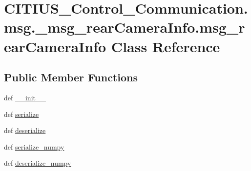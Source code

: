 \hypertarget{class_c_i_t_i_u_s___control___communication_1_1msg_1_1__msg__rear_camera_info_1_1msg__rear_camera_info}{\section{\-C\-I\-T\-I\-U\-S\-\_\-\-Control\-\_\-\-Communication.\-msg.\-\_\-msg\-\_\-rear\-Camera\-Info.\-msg\-\_\-rear\-Camera\-Info \-Class \-Reference}
\label{class_c_i_t_i_u_s___control___communication_1_1msg_1_1__msg__rear_camera_info_1_1msg__rear_camera_info}
}
\subsection*{\-Public \-Member \-Functions}
\begin{DoxyCompactItemize}
\item 
def \hyperlink{class_c_i_t_i_u_s___control___communication_1_1msg_1_1__msg__rear_camera_info_1_1msg__rear_camera_info_af8b34b94c71a6fa082153e6481a459e1}{\-\_\-\-\_\-init\-\_\-\-\_\-}
\item 
def \hyperlink{class_c_i_t_i_u_s___control___communication_1_1msg_1_1__msg__rear_camera_info_1_1msg__rear_camera_info_abccc631270b8fcbbcd4726f9c55a16b2}{serialize}
\item 
def \hyperlink{class_c_i_t_i_u_s___control___communication_1_1msg_1_1__msg__rear_camera_info_1_1msg__rear_camera_info_ad8c3299dc27130f31382dcd3f54e789d}{deserialize}
\item 
def \hyperlink{class_c_i_t_i_u_s___control___communication_1_1msg_1_1__msg__rear_camera_info_1_1msg__rear_camera_info_a896ae2ce8ae993f7322bc24c72c9e9f8}{serialize\-\_\-numpy}
\item 
def \hyperlink{class_c_i_t_i_u_s___control___communication_1_1msg_1_1__msg__rear_camera_info_1_1msg__rear_camera_info_a1890b7cc43aeeba9b08c5bcc74ed4b49}{deserialize\-\_\-numpy}
\end{DoxyCompactItemize}
